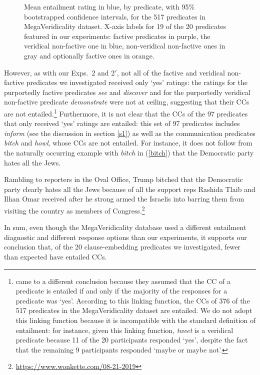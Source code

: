 \documentclass[11pt,fleqn]{article}
\newcommand{\6}{\mbox{$[\hspace*{-.6mm}[$}}
\newcommand{\9}{\mbox{$]\hspace*{-.6mm}]$}}
\begin{document}
{\begin{figure}[H]
\caption{Mean entailment rating in blue, by predicate, with 95\% bootstrapped confidence intervals, for the 517 predicates in MegaVeridicality dataset. X-axis labels for 19 of the 20 predicates featured in our experiments: factive predicates in purple, the veridical non-factive one in blue, non-veridical non-factive ones in gray and optionally factive ones in orange.}
\label{f-white-rawlins-ent}
\end{figure}

However, as with our Exps.~2 and 2$'$, not all of the factive and veridical non-factive predicates we investigated received only `yes' ratings: the ratings for the purportedly factive predicates {\em see} and {\em discover} and for the purportedly veridical non-factive predicate {\em demonstrate} were not at ceiling, suggesting that their CCs are not entailed.\footnote{\label{mv}\citet{white-rawlins-nels2018} came to a different conclusion because they assumed that the CC of a predicate is entailed if and only if the majority of the responses for a predicate was `yes'. According to this linking function, the CCs of 376 of the 517 predicates in the MegaVeridicality dataset are entailed. We do not adopt this linking function because it is incompatible with the standard definition of entailment: for instance, given this linking function, {\em tweet} is a veridical predicate because 11 of the 20 participants responded `yes', despite the fact that the remaining 9 participants responded `maybe or maybe not'.} Furthermore, it is not clear that the CCs of the 97  predicates that only received `yes' ratings are entailed: this set of 97 predicates includes {\em inform} (see the discussion in section \ref{s1}) as well as the communication predicates {\em bitch} and {\em howl}, whose CCs are not entailed. For instance, it does not follow from the naturally occurring example with {\em bitch} in (\ref{bitch}) that the Democratic party hates all the Jews.

\begin{exe}
\ex\label{bitch} Rambling to reporters in the Oval Office, Trump bitched that the Democratic party clearly hates all the Jews because of all the support reps Rashida Tlaib and Ilhan Omar received after he strong armed the Israelis into barring them from visiting the country as members of Congress.\footnote{\url{https://www.wonkette.com/08-21-2019}}
\end{exe}
In sum, even though the MegaVeridicality database used a different entailment diagnostic and different response options than our experiments, it supports our conclusion that, of the 20 clause-embedding predicates we investigated, fewer than expected have entailed CCs. 
 
}
\end{document}
